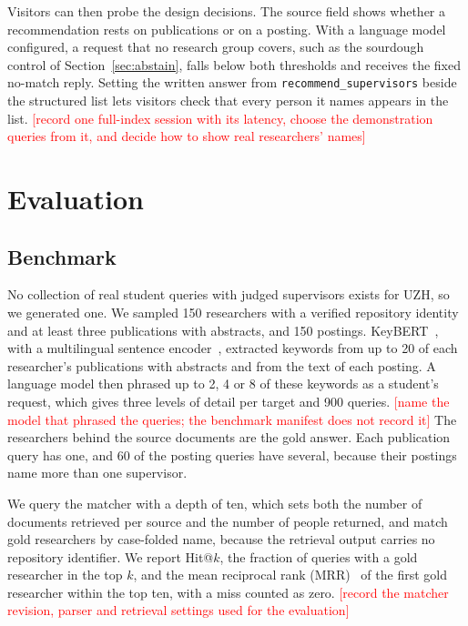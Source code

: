 \documentclass[sigconf,nonacm]{acmart}
\newcommand{\TODO}[1]{\textcolor{red}{[#1]}}
\begin{document}
Visitors can then probe the design decisions. The source field shows whether a recommendation rests on publications or on a posting. With a language model configured, a request that no research group covers, such as the sourdough control of Section~\ref{sec:abstain}, falls below both thresholds and receives the fixed no-match reply. Setting the written answer from \texttt{recommend\_supervisors} beside the structured list lets visitors check that every person it names appears in the list. \TODO{record one full-index session with its latency, choose the demonstration queries from it, and decide how to show real researchers' names}

\section{Evaluation}\label{sec:eval}

\subsection{Benchmark}

No collection of real student queries with judged supervisors exists for UZH, so we generated one. We sampled 150 researchers with a verified repository identity and at least three publications with abstracts, and 150 postings. KeyBERT~\cite{grootendorst2020keybert}, with a multilingual sentence encoder~\cite{reimers2020multilingual}, extracted keywords from up to 20 of each researcher's publications with abstracts and from the text of each posting. A language model then phrased up to 2, 4 or 8 of these keywords as a student's request, which gives three levels of detail per target and 900 queries. \TODO{name the model that phrased the queries; the benchmark manifest does not record it} The researchers behind the source documents are the gold answer. Each publication query has one, and 60 of the posting queries have several, because their postings name more than one supervisor.

We query the matcher with a depth of ten, which sets both the number of documents retrieved per source and the number of people returned, and match gold researchers by case-folded name, because the retrieval output carries no repository identifier. We report Hit@$k$, the fraction of queries with a gold researcher in the top $k$, and the mean reciprocal rank (MRR)~\cite{voorhees1999trec8} of the first gold researcher within the top ten, with a miss counted as zero. \TODO{record the matcher revision, parser and retrieval settings used for the evaluation}
\end{document}
